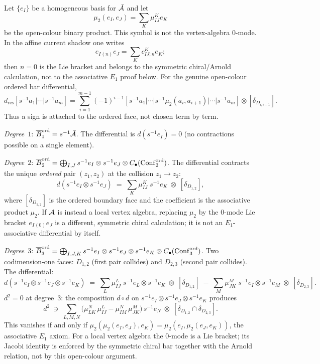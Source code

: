 \begin{construction}
\label{constr:ordered-bar-low-degree}
Let $\{e_I\}$ be a homogeneous basis for $\bar{\mathcal{A}}$ and let
\[
\mu_2(e_I,e_J)=\sum_K\mu^K_{IJ}e_K
\]
be the open-colour binary product.  This symbol is not the
vertex-algebra \(0\)-mode.  In the affine current shadow one writes
\[
e_I{}_{(n)}e_J=\sum_K c^K_{IJ;n}e_K ;
\]
then \(n=0\) is the Lie bracket and belongs to the symmetric
chiral/Arnold calculation, not to the associative \(E_1\) proof below.
For the genuine open-colour ordered bar differential,
\[
d_{\mathrm{res}}[s^{-1}a_1|\cdots|s^{-1}a_m]
=
\sum_{i=1}^{m-1}(-1)^{i-1}
[s^{-1}a_1|\cdots|
s^{-1}\mu_2(a_i,a_{i+1})|\cdots|s^{-1}a_m]
\otimes[\delta_{D_{i,i+1}}].
\]
Thus a sign is attached to the ordered face, not chosen term by term.

\emph{Degree~$1$}: $\overline{B}^{\mathrm{ord}}_1=s^{-1}\bar{\mathcal{A}}$.
The differential is $d(s^{-1}e_I)=0$ (no contractions
possible on a single element).

\emph{Degree~$2$}: $\overline{B}^{\mathrm{ord}}_2
=\bigoplus_{I,J}s^{-1}e_I\otimes s^{-1}e_J\otimes
C_\bullet(\mathrm{Conf}_2^{\mathrm{ord}})$.
The differential contracts the unique \emph{ordered} pair
$(z_1,z_2)$ at the collision $z_1\to z_2$:
\begin{equation}\label{eq:ordered-bar-d2}
d(s^{-1}e_I\otimes s^{-1}e_J)
\;=\;
\sum_K\mu^K_{IJ}\;s^{-1}e_K
\;\otimes\;
[\delta_{D_{1,2}}],
\end{equation}
where $[\delta_{D_{1,2}}]$ is the ordered boundary face and the
coefficient is the associative product \(\mu_2\).  If \(\mathcal{A}\) is
instead a local vertex algebra, replacing \(\mu_2\) by the \(0\)-mode
Lie bracket \(e_I{}_{(0)}e_J\) is a different, symmetric chiral
calculation; it is not an \(E_1\)-associative differential by itself.

\emph{Degree~$3$}: $\overline{B}^{\mathrm{ord}}_3
=\bigoplus_{I,J,K}s^{-1}e_I\otimes s^{-1}e_J\otimes
s^{-1}e_K\otimes
C_\bullet(\mathrm{Conf}_3^{\mathrm{ord}})$.
Two codimension-one faces: $D_{1,2}$ (first pair collides)
and $D_{2,3}$ (second pair collides). The differential:
\begin{equation}\label{eq:ordered-bar-d3}
d(s^{-1}e_I\otimes s^{-1}e_J\otimes s^{-1}e_K)
\;=\;
\sum_L \mu^L_{IJ}\;
s^{-1}e_L\otimes s^{-1}e_K
\;\otimes\;[\delta_{D_{1,2}}]
\;-\;
\sum_M \mu^M_{JK}\;
s^{-1}e_I\otimes s^{-1}e_M
\;\otimes\;[\delta_{D_{2,3}}].
\end{equation}
$d^2=0$ at degree~$3$: the composition $d\circ d$ on
$s^{-1}e_I\otimes s^{-1}e_J\otimes s^{-1}e_K$ produces
\[
d^2\;\ni\;
\sum_{L,M,N}\bigl(
\mu^N_{LK}\,\mu^L_{IJ}
-\mu^N_{IM}\,\mu^M_{JK}
\bigr)\,s^{-1}e_N
\;\otimes\;[\delta_{D_{1,2}}\cap\delta_{D_{2,3}}].
\]
This vanishes if and only if
\(\mu_2(\mu_2(e_I,e_J),e_K)
=\mu_2(e_I,\mu_2(e_J,e_K))\), the associative \(E_1\) axiom.
For a local vertex algebra the \(0\)-mode is a Lie bracket; its
Jacobi identity is enforced by the symmetric chiral bar together with
the Arnold relation, not by this open-colour argument.
\end{construction}

